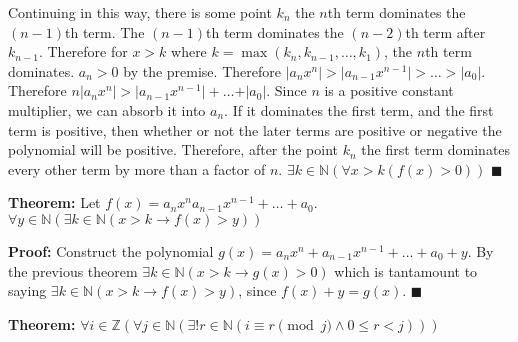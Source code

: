 Continuing in this way, there is some point \(k_n\) the \(n\)th term dominates the \((n-1)\)th term. The \((n-1)\)th term dominates the \((n-2)\)th term after \(k_{n-1}\). Therefore for \(x > k\) where \(k = \max(k_n, k_{n-1}, \dots, k_1)\), the \(n\)th term dominates. \(a_n > 0\) by the premise. Therefore \(\lvert a_n x^n \rvert > \lvert a_{n-1} x^{n-1} \rvert > \dots > \rvert a_0 \lvert\). Therefore \(n \lvert a_n x^n \rvert > \lvert a_{n-1} x^{n-1} \rvert + \dots + \rvert a_0 \lvert\). Since \(n\) is a positive constant multiplier, we can absorb it into \(a_n\). If it dominates the first term, and the first term is positive, then whether or not the later terms are positive or negative the polynomial will be positive. Therefore, after the point \(k_n\) the first term dominates every other term by more than a factor of \(n\). \(\exists k \in \mathbb N (\forall x > k (f(x) > 0))\) {\tiny \(\blacksquare\)}

\item \textbf{Theorem:} Let \(f(x) = a_n x^n a_{n-1} x^{n-1} + \dots + a_0\). \(\forall y \in \mathbb N (\exists k \in \mathbb N (x > k \rightarrow f(x) > y))\)

\textbf{Proof:} Construct the polynomial \(g(x) = a_n x^n + a_{n-1} x^{n-1} + \dots + a_0 + y\). By the previous theorem \(\exists k \in \mathbb N (x > k \rightarrow g(x) > 0)\) which is tantamount to saying \(\exists k \in \mathbb N (x > k \rightarrow f(x) > y)\), since \(f(x) + y = g(x)\). {\tiny \(\blacksquare\)}

\setcounter{enumii}{13}
\item \textbf{Theorem:} \(\forall i \in \mathbb Z (\forall j \in \mathbb N (\exists ! r \in \mathbb N (i \equiv r \pmod j \wedge 0 \leq r < j)))\)

